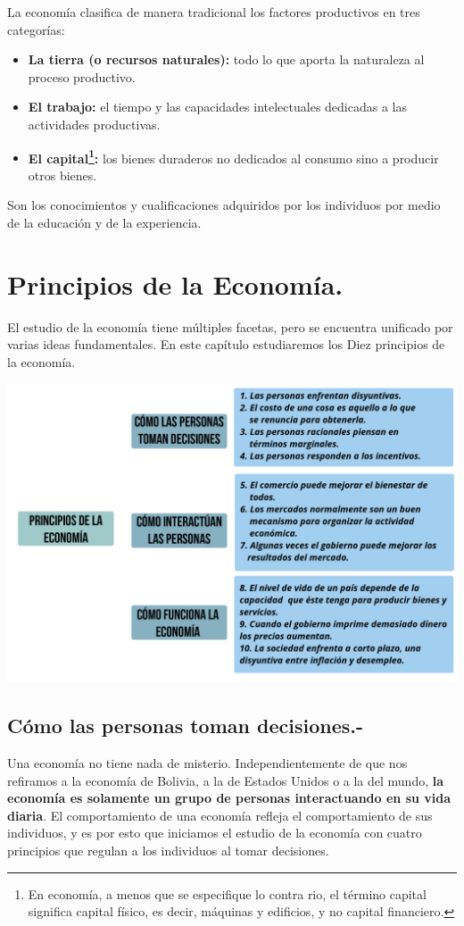 La economía clasifica de manera tradicional los factores productivos en tres categorías:
\begin{itemize}
	\item \textbf{La tierra (o recursos naturales):} todo lo que aporta la	naturaleza al proceso productivo.
	\item \textbf{El trabajo:} el tiempo y las capacidades intelectuales	dedicadas a las actividades productivas.
	\item \textbf{El capital\footnote{En economía, a menos que se especifique lo contra	rio, el término capital significa capital físico, es decir,	máquinas y edificios, y no capital financiero.}:} los bienes duraderos no dedicados al consumo sino a producir otros bienes.
\end{itemize}

\begin{definicion}
	Son los conocimientos	y cualificaciones adquiridos por los individuos
	por medio de la educación y de la experiencia.
\end{definicion}

\section{Principios de la Economía.}
El estudio de la economía tiene múltiples facetas, pero se encuentra unificado por
varias ideas fundamentales. En este capítulo estudiaremos los Diez principios de la
economía.\\

\begin{center}
	\includegraphics[width=0.65\linewidth]{images/PrincipiosEconomia}\\
\end{center}

\subsection{Cómo las personas toman decisiones.-}
Una economía no tiene nada de misterio. Independientemente de que nos refiramos
a la economía de Bolivia, a la de Estados Unidos o a la del mundo, \textbf{la economía
es solamente un grupo de personas interactuando en su vida diaria}. El comportamiento de una economía refleja el comportamiento de sus individuos, y es por esto que iniciamos el estudio de la economía con cuatro principios que regulan a los individuos al tomar decisiones.
